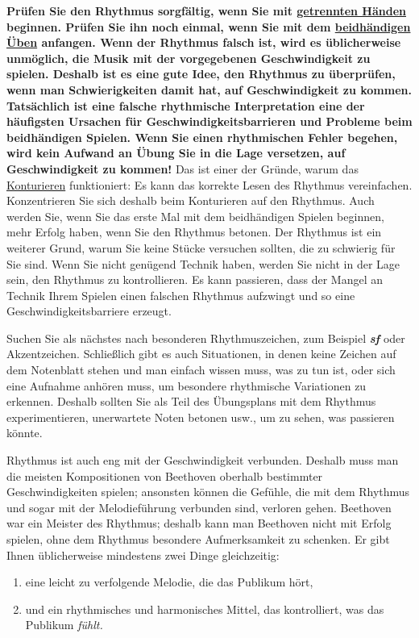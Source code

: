 \textbf{Prüfen Sie den Rhythmus sorgfältig, wenn Sie mit \hyperref[c1ii7]{getrennten Händen} beginnen.
Prüfen Sie ihn noch einmal, wenn Sie mit dem \hyperref[c1ii25]{beidhändigen Üben} anfangen.
Wenn der Rhythmus falsch ist, wird es üblicherweise unmöglich, die Musik  mit der vorgegebenen Geschwindigkeit zu spielen.
Deshalb ist es eine gute Idee, den Rhythmus zu überprüfen, wenn man Schwierigkeiten damit hat, auf Geschwindigkeit zu kommen.
Tatsächlich ist eine falsche rhythmische Interpretation eine der häufigsten Ursachen für Geschwindigkeitsbarrieren und Probleme beim beidhändigen Spielen.
Wenn Sie einen rhythmischen Fehler begehen, wird kein Aufwand an Übung Sie in die Lage versetzen, auf Geschwindigkeit zu kommen!}
Das ist einer der Gründe, warum das \hyperref[c1iii8]{Konturieren} funktioniert: Es kann das korrekte Lesen des Rhythmus vereinfachen.
Konzentrieren Sie sich deshalb beim Konturieren auf den Rhythmus.
Auch werden Sie, wenn Sie das erste Mal mit dem beidhändigen Spielen beginnen, mehr Erfolg haben, wenn Sie den Rhythmus betonen.
Der Rhythmus ist ein weiterer Grund, warum Sie keine Stücke versuchen sollten, die zu schwierig für Sie sind.
Wenn Sie nicht genügend Technik haben, werden Sie nicht in der Lage sein, den Rhythmus zu kontrollieren.
Es kann passieren, dass der Mangel an Technik Ihrem Spielen einen falschen Rhythmus aufzwingt und so eine Geschwindigkeitsbarriere erzeugt.

Suchen Sie als nächstes nach besonderen Rhythmuszeichen, zum Beispiel \textit{\textbf{sf}} oder Akzentzeichen.
Schließlich gibt es auch Situationen, in denen keine Zeichen auf dem Notenblatt stehen und man einfach wissen muss, was zu tun ist, oder sich eine Aufnahme anhören muss, um besondere rhythmische Variationen zu erkennen.
Deshalb sollten Sie als Teil des Übungsplans mit dem Rhythmus experimentieren, unerwartete Noten betonen usw., um zu sehen, was passieren könnte.

Rhythmus ist auch eng mit der Geschwindigkeit verbunden.
Deshalb muss man die meisten Kompositionen von Beethoven oberhalb bestimmter Geschwindigkeiten spielen; ansonsten können die Gefühle, die mit dem Rhythmus und sogar mit der Melodieführung verbunden sind, verloren gehen.
Beethoven war ein Meister des Rhythmus; deshalb kann man Beethoven nicht mit Erfolg spielen, ohne dem Rhythmus besondere Aufmerksamkeit zu schenken.
Er gibt Ihnen üblicherweise mindestens zwei Dinge gleichzeitig:

\begin{enumerate}[label={\roman*.}] 
 \item eine leicht zu verfolgende Melodie, die das Publikum hört,
 \item und ein rhythmisches und harmonisches Mittel, das kontrolliert, was das Publikum \textit{fühlt.}
\end{enumerate}

